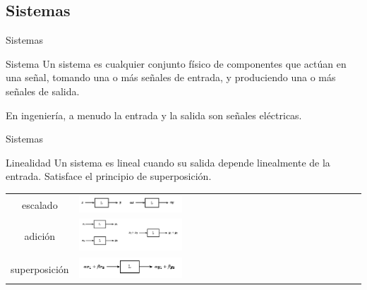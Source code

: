  \subsection{Sistemas}
 \begin{frame}{Sistemas}
    \begin{block}{Sistema}
       Un sistema es cualquier conjunto físico de componentes que actúan en una señal, tomando una o más señales de entrada, y produciendo una o más señales de salida.
    \end{block}
    En ingeniería, a menudo la entrada y la salida son señales eléctricas.\\
    \vfill
 \end{frame}
 \begin{frame}{Sistemas}
    \begin{block}{Linealidad}
       Un sistema es lineal cuando su salida depende linealmente de la entrada.
       Satisface el principio de superposición.
    \end{block}
    \begin{centering}
       \begin{table}[h]
          \begin{tabular}{cm{6cm}cm{6cm}}
             escalado      & \includegraphics[width=0.4\textwidth]{1_clase/superposicion1}\\
             adición       & \includegraphics[width=0.4\textwidth]{1_clase/superposicion2}\\
             superposición & \includegraphics[width=0.4\textwidth]{1_clase/superposicion3}\\
          \end{tabular}
       \end{table}
    \end{centering}
    \vfill
 \end{frame}
